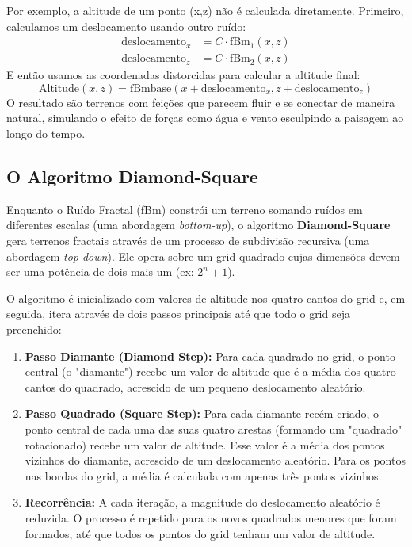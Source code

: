 Por exemplo, a altitude de um ponto (x,z) não é calculada diretamente. Primeiro, calculamos um deslocamento usando outro ruído:
\begin{align*}
    \text{deslocamento}_x &= C \cdot \text{fBm}_1(x, z) \\
    \text{deslocamento}_z &= C \cdot \text{fBm}_2(x, z)
\end{align*}
E então usamos as coordenadas distorcidas para calcular a altitude final:
\begin{equation*}
\text{Altitude}(x, z) = \text{fBm}{\text{base}}(x + \text{deslocamento}_x, z + \text{deslocamento}_z)
\end{equation*}
O resultado são terrenos com feições que parecem fluir e se conectar de maneira natural, simulando o efeito de forças como água e vento esculpindo a paisagem ao longo do tempo.

\subsection{O Algoritmo Diamond-Square}

Enquanto o Ruído Fractal (fBm) constrói um terreno somando ruídos em diferentes escalas (uma abordagem \textit{bottom-up}), o algoritmo \textbf{Diamond-Square} gera terrenos fractais através de um processo de subdivisão recursiva (uma abordagem \textit{top-down}). Ele opera sobre um grid quadrado cujas dimensões devem ser uma potência de dois mais um (ex: $2^n + 1$).

O algoritmo é inicializado com valores de altitude nos quatro cantos do grid e, em seguida, itera através de dois passos principais até que todo o grid seja preenchido:

\begin{enumerate}
    \item \textbf{Passo Diamante (Diamond Step):} Para cada quadrado no grid, o ponto central (o "diamante") recebe um valor de altitude que é a média dos quatro cantos do quadrado, acrescido de um pequeno deslocamento aleatório.

    \item \textbf{Passo Quadrado (Square Step):} Para cada diamante recém-criado, o ponto central de cada uma das suas quatro arestas (formando um "quadrado" rotacionado) recebe um valor de altitude. Esse valor é a média dos pontos vizinhos do diamante, acrescido de um deslocamento aleatório. Para os pontos nas bordas do grid, a média é calculada com apenas três pontos vizinhos.

    \item \textbf{Recorrência:} A cada iteração, a magnitude do deslocamento aleatório é reduzida. O processo é repetido para os novos quadrados menores que foram formados, até que todos os pontos do grid tenham um valor de altitude.
\end{enumerate}

